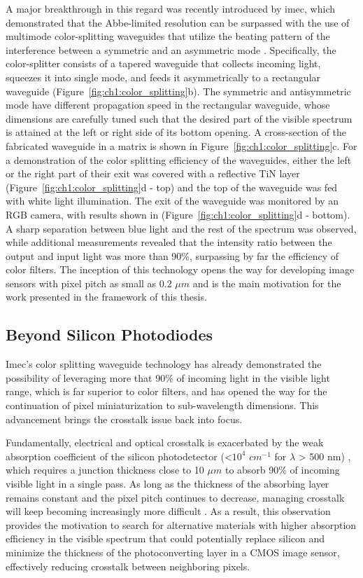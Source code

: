 A major breakthrough in this regard was recently introduced by imec, which demonstrated that the Abbe-limited resolution can be surpassed with the use of multimode color-splitting waveguides that utilize the beating pattern of the interference between a symmetric and an asymmetric mode \cite{Kang2023Wafer-level-integratedSplitters}. Specifically, the color-splitter consists of a tapered waveguide that collects incoming light, squeezes it into single mode, and feeds it asymmetrically to a rectangular waveguide (Figure~\ref{fig:ch1:color_splitting}b). The symmetric and antisymmetric mode have different propagation speed in the rectangular waveguide, whose dimensions are carefully tuned such that the desired part of the visible spectrum is attained at the left or right side of its bottom opening. A cross-section of the fabricated  waveguide in a  matrix is shown in Figure~\ref{fig:ch1:color_splitting}c. For a demonstration of the color splitting efficiency of the waveguides, either the left or the right part of their exit was covered with a reflective TiN layer (Figure~\ref{fig:ch1:color_splitting}d - top) and the top of the waveguide was fed with white light illumination. The exit of the waveguide was monitored by an RGB camera, with results shown in (Figure~\ref{fig:ch1:color_splitting}d - bottom). A sharp separation between blue light and the rest of the spectrum was observed, while additional measurements revealed that the intensity ratio between the output and input light was more than 90\%, surpassing by far the efficiency of color filters. The inception of this technology opens the way for developing image sensors with pixel pitch as small as 0.2 $\mu m$ and is the main motivation for the work presented in the framework of this thesis. 


\subsection{Beyond Silicon Photodiodes}

Imec's color splitting waveguide technology has already demonstrated the possibility of leveraging more that 90\% of incoming light in the visible light range, which is far superior to color filters, and has opened the way for the continuation of pixel miniaturization to sub-wavelength dimensions. This advancement brings the crosstalk issue back into focus. 

Fundamentally, electrical and optical crosstalk is exacerbated by the weak absorption coefficient of the silicon photodetector (<$10^{4}$ $cm^{-1}$ for $\lambda$ > 500 nm) \cite{Herzinger1998EllipsometricInvestigation}, which requires a junction thickness close to 10 $\mu m$ to absorb 90\% of incoming visible light in a single pass. As long as the thickness of the absorbing layer remains constant and the pixel pitch continues to decrease, managing crosstalk will keep becoming increasingly more difficult \cite{Agranov2003CrosstalkSensor}. As a result, this observation provides the motivation to search for alternative materials with higher absorption efficiency in the visible spectrum that could potentially replace silicon and minimize the thickness of the photoconverting layer in a CMOS image sensor, effectively reducing crosstalk between neighboring pixels. 

